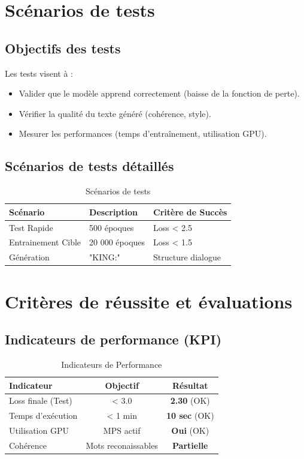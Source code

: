 \documentclass[a4paper]{article}
\begin{document}
\section{Scénarios de tests}

\subsection{Objectifs des tests}
Les tests visent à :
\begin{itemize}
    \item Valider que le modèle apprend correctement (baisse de la fonction de perte).
    \item Vérifier la qualité du texte généré (cohérence, style).
    \item Mesurer les performances (temps d'entraînement, utilisation GPU).
\end{itemize}

\subsection{Scénarios de tests détaillés}
\begin{table}[h]
\caption{Scénarios de tests}
\label{tab:scenarios}
\centering
\begin{tabular}{lll}
\toprule
\textbf{Scénario} & \textbf{Description} & \textbf{Critère de Succès} \\
\midrule
Test Rapide & 500 époques & Loss < 2.5 \\
Entrainement Cible & 20 000 époques & Loss < 1.5 \\
Génération & "KING:" & Structure dialogue \\
\bottomrule
\end{tabular}
\end{table}

\section{Critères de réussite et évaluations}

\subsection{Indicateurs de performance (KPI)}
\begin{table}[h]
\caption{Indicateurs de Performance}
\label{tab:kpi}
\centering
\begin{tabular}{lcc}
\toprule
\textbf{Indicateur} & \textbf{Objectif} & \textbf{Résultat} \\
\midrule
Loss finale (Test) & < 3.0 & \textbf{2.30} (OK) \\
Temps d'exécution & < 1 min & \textbf{10 sec} (OK) \\
Utilisation GPU & MPS actif & \textbf{Oui} (OK) \\
Cohérence & Mots reconaissables & \textbf{Partielle} \\
\bottomrule
\end{tabular}
\end{table}
\end{document}
